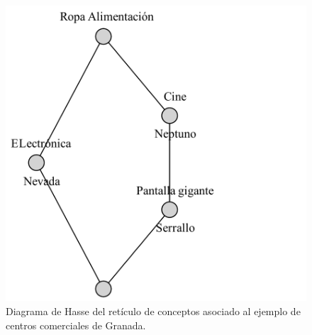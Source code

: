 \documentclass[oneside,openright,titlepage,numbers=noenddot,openany,headinclude,footinclude=true,
cleardoublepage=empty,abstractoff,BCOR=5mm,paper=a4,fontsize=12pt,main=spanish]{scrreprt}
\begin{document}
\begin{figure}[H]
\begin{center}
\includegraphics[scale=0.7]{images/graphvizcomerciales.pdf}
\caption{Diagrama de Hasse del retículo de conceptos asociado al ejemplo de centros comerciales de Granada.}
\label{fig:comerciales}
\end{center}
\end{figure}
\end{document}
